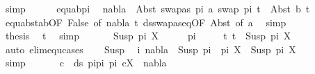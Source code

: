 \begin{isabellebody}
\ simp\isanewline
\ \ \ \ \isamarkupfalse%
\ equ{\isacharunderscore}{\kern0pt}ab{\isacharunderscore}{\kern0pt}pi{}\ \isamarkupfalse%
\ {\isachardoublequoteopen}nabla\ {\isasymturnstile}\ Abst\ {\isacharparenleft}{\kern0pt}swapas\ pi{}\ a{\isacharparenright}{\kern0pt}\ {\isacharparenleft}{\kern0pt}swap\ pi{}\ t{}{\isacharprime}{\kern0pt}{\isacharparenright}{\kern0pt}\ {\isasymapprox}\ Abst\ b\ t{}{\isacharprime}{\kern0pt}{\isachardoublequoteclose}\isanewline
\ \ \ \ \ \ \isamarkupfalse%
\ equ{\isacharunderscore}{\kern0pt}abst{\isacharunderscore}{\kern0pt}ab{\isacharbrackleft}{\kern0pt}OF\ False{\isacharcomma}{\kern0pt}\ of\ nabla\ t{}{\isacharprime}{\kern0pt}{\isacharbrackright}{\kern0pt}\ ds{\isacharunderscore}{\kern0pt}swapas{\isacharunderscore}{\kern0pt}eq{\isacharbrackleft}{\kern0pt}OF\ Abst{\isacharparenleft}{\kern0pt}{}{\isacharparenright}{\kern0pt}{\isacharcomma}{\kern0pt}\ of\ a{\isacharbrackright}{\kern0pt}\ \isamarkupfalse%
\ simp\isanewline
\ \ \ \ \isamarkupfalse%
\ \isamarkupfalse%
\ {\isacharquery}{\kern0pt}thesis\ \isamarkupfalse%
\ t{}\ \isamarkupfalse%
\ simp\isanewline
\ \ \isamarkupfalse%
\isanewline
{}\isamarkupfalse%
\isanewline
\ \ \isamarkupfalse%
\ {\isacharparenleft}{\kern0pt}Susp\ pi\ X{\isacharparenright}{\kern0pt}\isanewline
\ \ \isamarkupfalse%
\ \isamarkupfalse%
\ pi{\isacharprime}{\kern0pt}\isanewline
\ \ \ \ \ t{}{\isacharcolon}{\kern0pt}\ {\isachardoublequoteopen}t{}\ {\isacharequal}{\kern0pt}\ Susp\ pi{\isacharprime}{\kern0pt}\ X{\isachardoublequoteclose}\isanewline
\ \ \ \ \isamarkupfalse%
\ {\isacharparenleft}{\kern0pt}auto\ elim{\isacharcolon}{\kern0pt}equ{\isachardot}{\kern0pt}cases{\isacharparenright}{\kern0pt}\isanewline
\ \ \isamarkupfalse%
\ Susp\ \isamarkupfalse%
\ i{\isacharcolon}{\kern0pt}\ {\isachardoublequoteopen}nabla\ {\isasymturnstile}\ Susp\ {\isacharparenleft}{\kern0pt}pi{}\ {\isacharat}{\kern0pt}\ pi{\isacharparenright}{\kern0pt}\ X\ {\isasymapprox}\ Susp\ pi{\isacharprime}{\kern0pt}\ X{\isachardoublequoteclose}\ \isanewline
\ \ \ \ \isamarkupfalse%
\ simp\isanewline
\ \ \isamarkupfalse%
\ \isamarkupfalse%
\ {\isachardoublequoteopen}{\isasymforall}\ c\ {\isasymin}\ ds\ {\isacharparenleft}{\kern0pt}pi{}{\isacharat}{\kern0pt}pi{\isacharparenright}{\kern0pt}\ pi{\isacharprime}{\kern0pt}{\isachardot}{\kern0pt}\ {\isacharparenleft}{\kern0pt}c{\isacharcomma}{\kern0pt}X{\isacharparenright}{\kern0pt}\ {\isasymin}\ nabla{\isachardoublequoteclose}\isanewline

\end{isabellebody}
